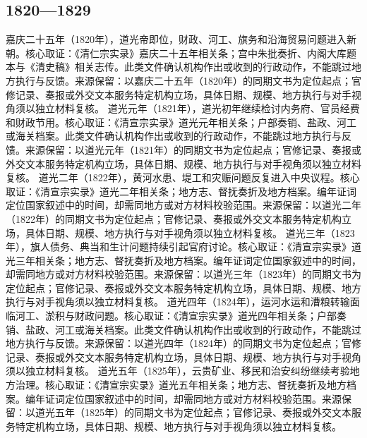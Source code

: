 \subsection{1820—1829}
嘉庆二十五年（1820年），道光帝即位，财政、河工、旗务和沿海贸易问题进入新朝。核心取证：《清仁宗实录》嘉庆二十五年相关条；宫中朱批奏折、内阁大库题本与《清史稿》相关志传。此类文件确认机构作出或收到的行政动作，不能跳过地方执行与反馈。来源保留：以嘉庆二十五年（1820年）的同期文书为定位起点；官修记录、奏报或外交文本服务特定机构立场，具体日期、规模、地方执行与对手视角须以独立材料复核。
道光元年（1821年），道光初年继续检讨内务府、官员经费和财政节用。核心取证：《清宣宗实录》道光元年相关条；户部奏销、盐政、河工或海关档案。此类文件确认机构作出或收到的行政动作，不能跳过地方执行与反馈。来源保留：以道光元年（1821年）的同期文书为定位起点；官修记录、奏报或外交文本服务特定机构立场，具体日期、规模、地方执行与对手视角须以独立材料复核。
道光二年（1822年），黄河水患、堤工和灾赈问题反复进入中央议程。核心取证：《清宣宗实录》道光二年相关条；地方志、督抚奏折及地方档案。编年证词定位国家叙述中的时间，却需同地方或对方材料校验范围。来源保留：以道光二年（1822年）的同期文书为定位起点；官修记录、奏报或外交文本服务特定机构立场，具体日期、规模、地方执行与对手视角须以独立材料复核。
道光三年（1823年），旗人债务、典当和生计问题持续引起官府讨论。核心取证：《清宣宗实录》道光三年相关条；地方志、督抚奏折及地方档案。编年证词定位国家叙述中的时间，却需同地方或对方材料校验范围。来源保留：以道光三年（1823年）的同期文书为定位起点；官修记录、奏报或外交文本服务特定机构立场，具体日期、规模、地方执行与对手视角须以独立材料复核。
道光四年（1824年），运河水运和漕粮转输面临河工、淤积与财政问题。核心取证：《清宣宗实录》道光四年相关条；户部奏销、盐政、河工或海关档案。此类文件确认机构作出或收到的行政动作，不能跳过地方执行与反馈。来源保留：以道光四年（1824年）的同期文书为定位起点；官修记录、奏报或外交文本服务特定机构立场，具体日期、规模、地方执行与对手视角须以独立材料复核。
道光五年（1825年），云贵矿业、移民和治安纠纷继续考验地方治理。核心取证：《清宣宗实录》道光五年相关条；地方志、督抚奏折及地方档案。编年证词定位国家叙述中的时间，却需同地方或对方材料校验范围。来源保留：以道光五年（1825年）的同期文书为定位起点；官修记录、奏报或外交文本服务特定机构立场，具体日期、规模、地方执行与对手视角须以独立材料复核。
